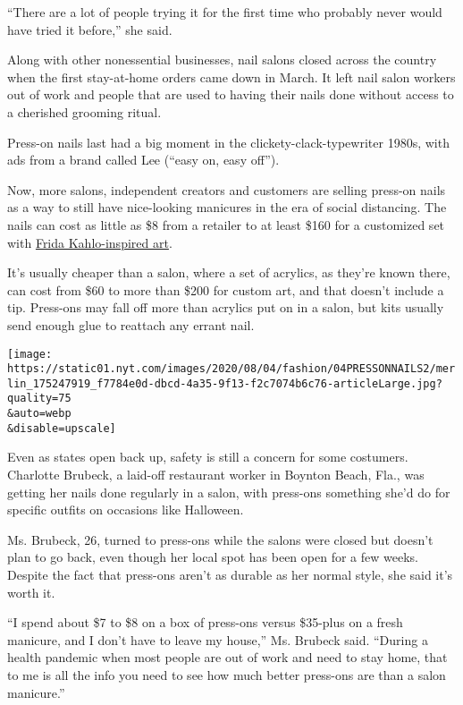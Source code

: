 ``There are a lot of people trying it for the first time who probably
never would have tried it before,'' she said.

Along with other nonessential businesses, nail salons closed across the
country when the first stay-at-home orders came down in March. It left
nail salon workers out of work and people that are used to having their
nails done without access to a cherished grooming ritual.

Press-on nails last had a big moment in the clickety-clack-typewriter
1980s, with ads from a brand called Lee (``easy on, easy off'').

Now, more salons, independent creators and customers are selling
press-on nails as a way to still have nice-looking manicures in the era
of social distancing. The nails can cost as little as \$8 from a
retailer to at least \$160 for a customized set with
\href{https://www.etsy.com/listing/788328318/unique-frida-kahlo-inspired-nails-luxury?ref=shop_home_active_1\&frs=1}{Frida
Kahlo-inspired art}.

It's usually cheaper than a salon, where a set of acrylics, as they're
known there, can cost from \$60 to more than \$200 for custom art, and
that doesn't include a tip. Press-ons may fall off more than acrylics
put on in a salon, but kits usually send enough glue to reattach any
errant nail.

\texttt{[image: https://static01.nyt.com/images/2020/08/04/fashion/04PRESSONNAILS2/merlin\_175247919\_f7784e0d-dbcd-4a35-9f13-f2c7074b6c76-articleLarge.jpg?quality=75\\\&auto=webp\\\&disable=upscale]}

Even as states open back up, safety is still a concern for some
costumers. Charlotte Brubeck, a laid-off restaurant worker in Boynton
Beach, Fla., was getting her nails done regularly in a salon, with
press-ons something she'd do for specific outfits on occasions like
Halloween.

Ms. Brubeck, 26, turned to press-ons while the salons were closed but
doesn't plan to go back, even though her local spot has been open for a
few weeks. Despite the fact that press-ons aren't as durable as her
normal style, she said it's worth it.

``I spend about \$7 to \$8 on a box of press-ons versus \$35-plus on a
fresh manicure, and I don't have to leave my house,'' Ms. Brubeck said.
``During a health pandemic when most people are out of work and need to
stay home, that to me is all the info you need to see how much better
press-ons are than a salon manicure.''

